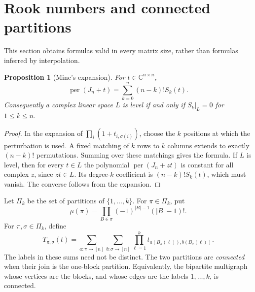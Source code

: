 \documentclass[11pt]{article}
\newcommand{\C}{\mathbb C}
\DeclareMathOperator{\per}{per}
\newtheorem{proposition}[theorem]{Proposition}
\theoremstyle{definition}
\theoremstyle{remark}
\begin{document}
\section{Rook numbers and connected partitions}
This section obtains formulas valid in every matrix size, rather than formulas inferred by interpolation.

\begin{proposition}[Minc's expansion]\label{prop:minc}
For $t\in\C^{n\times n}$,
\[
 \per(J_n+t)=\sum_{k=0}^n(n-k)!S_k(t).
\]
Consequently a complex linear space $L$ is level if and only if $S_k|_L=0$ for $1\leq k\leq n$.
\end{proposition}
\begin{proof}
In the expansion of $\prod_i(1+t_{i,\sigma(i)})$, choose the $k$ positions at which the perturbation is used. A fixed matching of $k$ rows to $k$ columns extends to exactly $(n-k)!$ permutations. Summing over these matchings gives the formula.
If $L$ is level, then for every $t\in L$ the polynomial $\per(J_n+zt)$ is constant for all complex $z$, since $zt\in L$. Its degree-$k$ coefficient is $(n-k)!S_k(t)$, which must vanish. The converse follows from the expansion.
\end{proof}

Let $\Pi_k$ be the set of partitions of $\{1,\ldots,k\}$. For $\pi\in\Pi_k$, put
\[
 \mu(\pi)=\prod_{B\in\pi}(-1)^{|B|-1}(|B|-1)!.
\]
For $\pi,\sigma\in\Pi_k$, define
\[
 T_{\pi,\sigma}(t)=
 \sum_{a:\pi\to[n]}\sum_{b:\sigma\to[n]}
 \prod_{\ell=1}^k t_{a(B_\pi(\ell)),b(B_\sigma(\ell))}.
\]
The labels in these sums need not be distinct. The two partitions are \emph{connected} when their join is the one-block partition. Equivalently, the bipartite multigraph whose vertices are the blocks, and whose edges are the labels $1,\ldots,k$, is connected.
\end{document}
